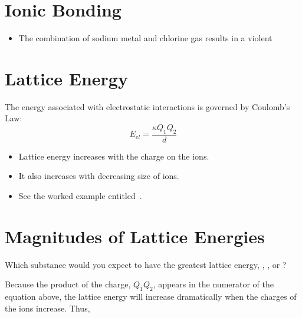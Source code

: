 \documentclass[
	chapter=9,
	title={Basic Concepts of Chemical Bonding},
	showanswers=true,
]{chem122notes}
\begin{document}
\section{Ionic Bonding}\label{sec:ionic-bonding}
\begin{itemize}
	\item The combination of sodium metal and chlorine gas results in a violent
\end{itemize}

\section{Lattice Energy}\label{sec:lattice-energy}
The energy associated with electrostatic interactions is governed by Coulomb's Law:
\begin{equation}
	E_{el} = \frac{\kappa Q_{1}Q_{2}}{d}
	\label{eq:coulombs-law}
\end{equation}
\begin{itemize}
	\item Lattice energy increases with the charge on the ions.
	\item It also increases with decreasing size of ions.
	\item See the worked example entitled~.
\end{itemize}

\section{Magnitudes of Lattice Energies}\label{sec:magnitudes-of-lattice-energies}
Which substance would you expect to have the greatest lattice energy, , , or ?

\begin{answer}
	Because the product of the charge, $Q_{1}Q_{2}$, appears in the numerator of the equation above, the lattice energy will increase dramatically when the charges of the ions increase.
	Thus,
\end{answer}
\end{document}
